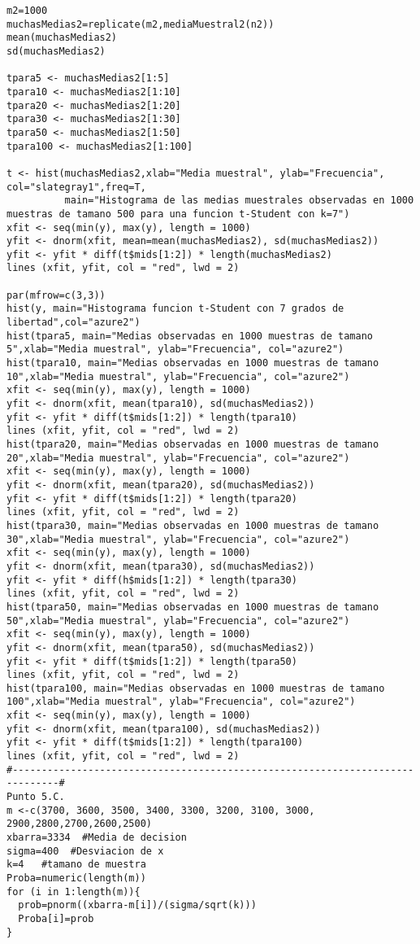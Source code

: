 \documentclass[letterpaper,12pt,onecolumn,titlepage]{article}
\begin{document}
\begin{verbatim}
m2=1000
muchasMedias2=replicate(m2,mediaMuestral2(n2))
mean(muchasMedias2)
sd(muchasMedias2)

tpara5 <- muchasMedias2[1:5]
tpara10 <- muchasMedias2[1:10]
tpara20 <- muchasMedias2[1:20]
tpara30 <- muchasMedias2[1:30]
tpara50 <- muchasMedias2[1:50]
tpara100 <- muchasMedias2[1:100]

t <- hist(muchasMedias2,xlab="Media muestral", ylab="Frecuencia", col="slategray1",freq=T,
          main="Histograma de las medias muestrales observadas en 1000 muestras de tamano 500 para una funcion t-Student con k=7")
xfit <- seq(min(y), max(y), length = 1000)
yfit <- dnorm(xfit, mean=mean(muchasMedias2), sd(muchasMedias2))
yfit <- yfit * diff(t$mids[1:2]) * length(muchasMedias2)
lines (xfit, yfit, col = "red", lwd = 2)

par(mfrow=c(3,3))
hist(y, main="Histograma funcion t-Student con 7 grados de libertad",col="azure2")
hist(tpara5, main="Medias observadas en 1000 muestras de tamano 5",xlab="Media muestral", ylab="Frecuencia", col="azure2")
hist(tpara10, main="Medias observadas en 1000 muestras de tamano 10",xlab="Media muestral", ylab="Frecuencia", col="azure2")
xfit <- seq(min(y), max(y), length = 1000)
yfit <- dnorm(xfit, mean(tpara10), sd(muchasMedias2))
yfit <- yfit * diff(t$mids[1:2]) * length(tpara10)
lines (xfit, yfit, col = "red", lwd = 2)
hist(tpara20, main="Medias observadas en 1000 muestras de tamano 20",xlab="Media muestral", ylab="Frecuencia", col="azure2")
xfit <- seq(min(y), max(y), length = 1000)
yfit <- dnorm(xfit, mean(tpara20), sd(muchasMedias2))
yfit <- yfit * diff(t$mids[1:2]) * length(tpara20)
lines (xfit, yfit, col = "red", lwd = 2)
hist(tpara30, main="Medias observadas en 1000 muestras de tamano 30",xlab="Media muestral", ylab="Frecuencia", col="azure2")
xfit <- seq(min(y), max(y), length = 1000)
yfit <- dnorm(xfit, mean(tpara30), sd(muchasMedias2))
yfit <- yfit * diff(h$mids[1:2]) * length(tpara30)
lines (xfit, yfit, col = "red", lwd = 2)
hist(tpara50, main="Medias observadas en 1000 muestras de tamano 50",xlab="Media muestral", ylab="Frecuencia", col="azure2")
xfit <- seq(min(y), max(y), length = 1000)
yfit <- dnorm(xfit, mean(tpara50), sd(muchasMedias2))
yfit <- yfit * diff(t$mids[1:2]) * length(tpara50)
lines (xfit, yfit, col = "red", lwd = 2)
hist(tpara100, main="Medias observadas en 1000 muestras de tamano 100",xlab="Media muestral", ylab="Frecuencia", col="azure2")
xfit <- seq(min(y), max(y), length = 1000)
yfit <- dnorm(xfit, mean(tpara100), sd(muchasMedias2))
yfit <- yfit * diff(t$mids[1:2]) * length(tpara100)
lines (xfit, yfit, col = "red", lwd = 2)
#------------------------------------------------------------------------------#
Punto 5.C.
m <-c(3700, 3600, 3500, 3400, 3300, 3200, 3100, 3000, 2900,2800,2700,2600,2500)
xbarra=3334  #Media de decision
sigma=400  #Desviacion de x
k=4   #tamano de muestra
Proba=numeric(length(m))
for (i in 1:length(m)){
  prob=pnorm((xbarra-m[i])/(sigma/sqrt(k)))
  Proba[i]=prob
}


\end{verbatim}
\end{document}
